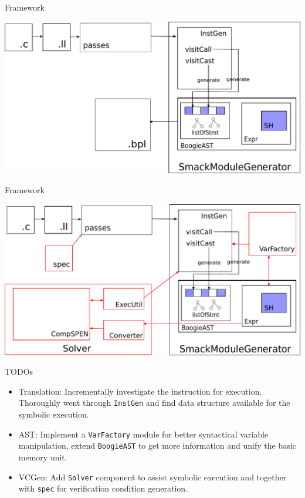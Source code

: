 \documentclass[aspectratio=1610, 13pt]{beamer}
\begin{document}
\begin{frame}{Framework}
\begin{center}
    \includegraphics[scale=.7]{smack.pdf}
\end{center}
\end{frame}

\begin{frame}{Framework}
    
\begin{center}
    \includegraphics[scale=.7]{gen.pdf}
\end{center}
\end{frame}

\begin{frame}{TODOs}
\begin{itemize}
    \item Translation: Incrementally investigate the instruction for execution. Thoroughly went through \texttt{InstGen} and find data structure available for the symbolic execution.
    \item AST: Implement a \texttt{VarFactory} module for better syntactical variable manipulation, extend \texttt{BoogieAST} to get more information and unify the basic memory unit.
    \item VCGen: Add \texttt{Solver} component to assist symbolic execution and together with \texttt{spec} for verification condition generation.
\end{itemize}
\end{frame}
\end{document}

